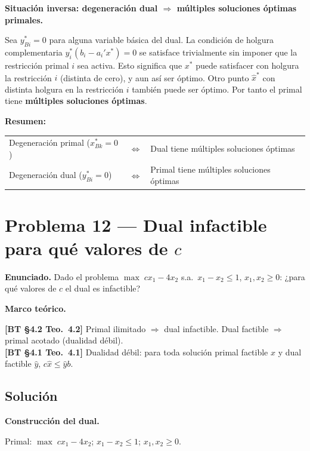 \documentclass{article}
\newenvironment{marco}{\begin{mdframed}[linecolor=black!40,backgroundcolor=gray!5]\small\textbf{Marco teórico.}\par\smallskip}{\end{mdframed}\medskip}
\begin{document}
\textbf{Situación inversa: degeneración dual $\Rightarrow$ múltiples soluciones óptimas primales.}

Sea $y_{Bi}^* = 0$ para alguna variable básica del dual. La condición de holgura complementaria $y_i^*(b_i - a_i'x^*) = 0$ se satisface trivialmente sin imponer que la restricción primal $i$ sea activa. Esto significa que $x^*$ puede satisfacer con holgura la restricción $i$ (distinta de cero), y aun así ser óptimo. Otro punto $\hat{x}^*$ con distinta holgura en la restricción $i$ también puede ser óptimo. Por tanto el primal tiene \textbf{múltiples soluciones óptimas}.

\medskip
\noindent\textbf{Resumen:}
\begin{center}
\begin{tabular}{lcl}
\hline
Degeneración primal ($x_{Bk}^* = 0$) & $\Leftrightarrow$ & Dual tiene múltiples soluciones óptimas \\
Degeneración dual ($y_{Bi}^* = 0$) & $\Leftrightarrow$ & Primal tiene múltiples soluciones óptimas \\
\hline
\end{tabular}
\end{center}

\section*{Problema 12 --- Dual infactible para qué valores de $c$}

\textbf{Enunciado.} Dado el problema $\max\; cx_1 - 4x_2$ s.a.\ $x_1 - x_2 \leq 1$, $x_1, x_2 \geq 0$: ¿para qué valores de $c$ el dual es infactible?

\begin{marco}
\textbf{[BT §4.2 Teo.\ 4.2]} Primal ilimitado $\Rightarrow$ dual infactible. Dual factible $\Rightarrow$ primal acotado (dualidad débil). \\[2pt]
\textbf{[BT §4.1 Teo.\ 4.1]} Dualidad débil: para toda solución primal factible $\hat{x}$ y dual factible $\hat{y}$, $c\hat{x} \leq \hat{y}b$.
\end{marco}

\subsection*{Solución}

\textbf{Construcción del dual.}

Primal: $\max\; cx_1 - 4x_2$; $x_1 - x_2 \leq 1$; $x_1, x_2 \geq 0$.
\end{document}
